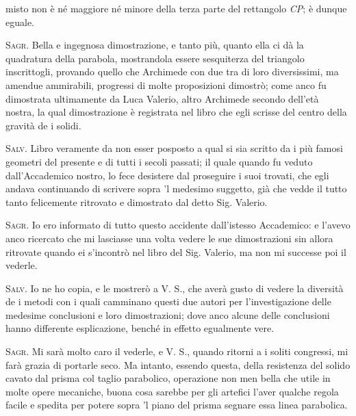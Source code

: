 \documentclass[11pt,twoside,openany]{book}
\newcommand{\speaker}[1]{\textcolor{rubric}{\textsc{#1}}\space}
\begin{document}
misto non è né maggiore né minore della terza parte del rettangolo \emph{CP}; è dunque eguale.

\speaker{Sagr.} Bella e ingegnosa dimostrazione, e tanto più, quanto ella ci dà la quadratura della parabola, mostrandola essere sesquiterza del triangolo inscrittogli, provando quello che Archimede con due tra di loro diversissimi, ma amendue ammirabili, progressi di molte proposizioni dimostrò; come anco fu dimostrata ultimamente da Luca Valerio, altro Archimede secondo dell'età nostra, la qual dimostrazione è registrata nel libro che egli scrisse del centro della gravità de i solidi.

\speaker{Salv.} Libro veramente da non esser posposto a qual si sia scritto da i più famosi geometri del presente e di tutti i secoli passati; il quale quando fu veduto dall'Accademico nostro, lo fece desistere dal proseguire i suoi trovati, che egli andava continuando di scrivere sopra 'l medesimo suggetto, già che vedde il tutto tanto felicemente ritrovato e dimostrato dal detto Sig. Valerio.

\speaker{Sagr.} Io ero informato di tutto questo accidente dall'istesso Accademico: e l'avevo anco ricercato che mi lasciasse una volta vedere le sue dimostrazioni sin allora ritrovate quando ei s'incontrò nel libro del Sig. Valerio, ma non mi successe poi il vederle.

\speaker{Salv.} Io ne ho copia, e le mostrerò a V. S., che averà gusto di vedere la diversità de i metodi con i quali camminano questi due autori per l'investigazione delle medesime conclusioni e loro dimostrazioni; dove anco alcune delle conclusioni hanno differente esplicazione, benché in effetto egualmente vere.

\speaker{Sagr.} Mi sarà molto caro il vederle, e V. S., quando ritorni a i soliti congressi, mi farà grazia di portarle seco. Ma intanto, essendo questa, della resistenza del solido cavato dal prisma col taglio parabolico, operazione non men bella che utile in molte opere mecaniche, buona cosa sarebbe per gli artefici l'aver qualche regola facile e spedita per potere sopra 'l piano del prisma segnare essa linea parabolica.
\end{document}
